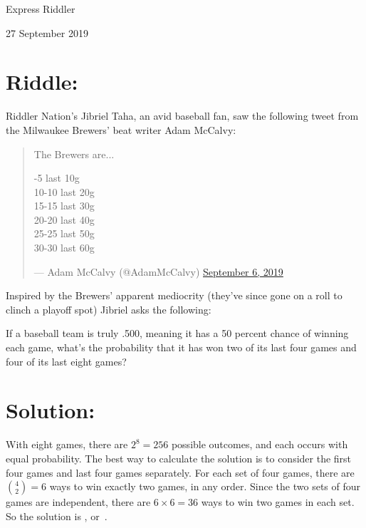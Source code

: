 \documentclass{article}
\begin{document}
\pagestyle{empty} %

\begin{center}
{\LARGE Express Riddler}

\vspace{0.15in}

{\Large 27 September 2019}
\end{center}


\section*{Riddle:}

Riddler Nation's Jibriel Taha, an avid baseball fan, saw the following tweet from the Milwaukee Brewers' beat writer Adam McCalvy:

\begin{quote}
The Brewers are...

-5 last 10g \\
10-10 last 20g \\
15-15 last 30g \\
20-20 last 40g \\
25-25 last 50g \\
30-30 last 60g

— Adam McCalvy (@AdamMcCalvy) \href{https://twitter.com/AdamMcCalvy/status/1170170706983866368}{September 6, 2019}
\end{quote}

Inspired by the Brewers' apparent mediocrity (they've since gone on a roll to clinch a playoff spot) Jibriel asks the following:

If a baseball team is truly .500, meaning it has a 50 percent chance of winning each game, what's the probability that it has won two of its last four games and four of its last eight games?

\section*{Solution:}

With eight games, there are $2^{8}=256$ possible outcomes, and each occurs with equal probability.
The best way to calculate the solution is to consider the first four games and last four games separately.
For each set of four games, there are $\binom{4}{2}=6$ ways to win exactly two games, in any order.
Since the two sets of four games are independent, there are $6\times6=36$ ways to win two games in each set.
So the solution is , or
\,.
\end{document}
